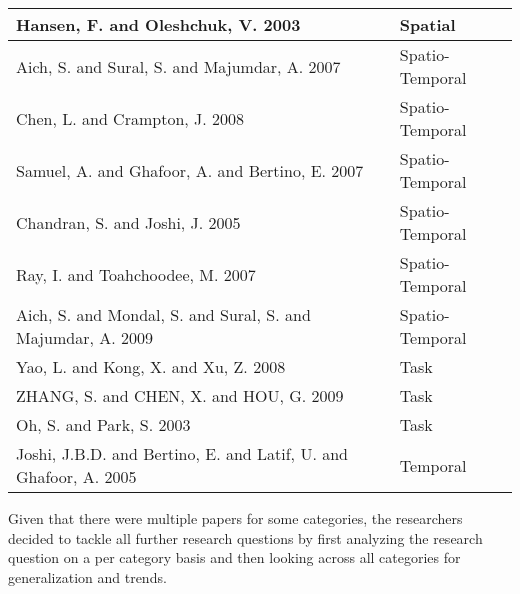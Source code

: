 \begin{center}
\begin{tabular}{|p{12.5cm}|p{3cm}|}
Hansen, F. and Oleshchuk, V. 2003 \cite{hansen2003spatial} & Spatial \\\hline
Aich, S. and Sural, S. and Majumdar, A. 2007 \cite{aich07:STARBAC} & Spatio-Temporal \\\hline
Chen, L. and Crampton, J. 2008 \cite{chen08:spatio-temporal} & Spatio-Temporal \\\hline
Samuel, A. and Ghafoor, A. and Bertino, E. 2007 \cite{samuel07:spatio-temporal} & Spatio-Temporal \\\hline
Chandran, S. and Joshi, J. 2005 \cite{chandran05:llt} & Spatio-Temporal \\\hline
Ray, I. and Toahchoodee, M. 2007 \cite{ray07:spatio} & Spatio-Temporal \\\hline
Aich, S. and Mondal, S. and Sural, S. and Majumdar, A. 2009 \cite{aich09:role} & Spatio-Temporal \\\hline
Yao, L. and Kong, X. and Xu, Z. 2008 \cite{yao2008task} & Task \\\hline
ZHANG, S. and CHEN, X. and HOU, G. 2009 \cite{zhou2007team} & Task \\\hline
Oh, S. and Park, S. 2003 \cite{oh2003task} & Task \\\hline
Joshi, J.B.D. and Bertino, E. and Latif, U. and Ghafoor, A. 2005 \cite{joshi05:generalized} & Temporal \\\hline
\end{tabular}
\end{center}

Given that there were multiple papers for some categories, the researchers decided to tackle all further research questions by first analyzing the research question on a per category basis and then looking across all categories for generalization and trends.
